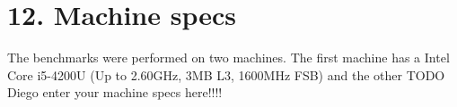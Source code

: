 \section*{12. Machine specs}
The benchmarks were performed on two machines. The first machine has a Intel Core i5-4200U (Up to 2.60GHz, 3MB L3, 1600MHz FSB) and the other TODO Diego enter your machine specs here!!!! 
